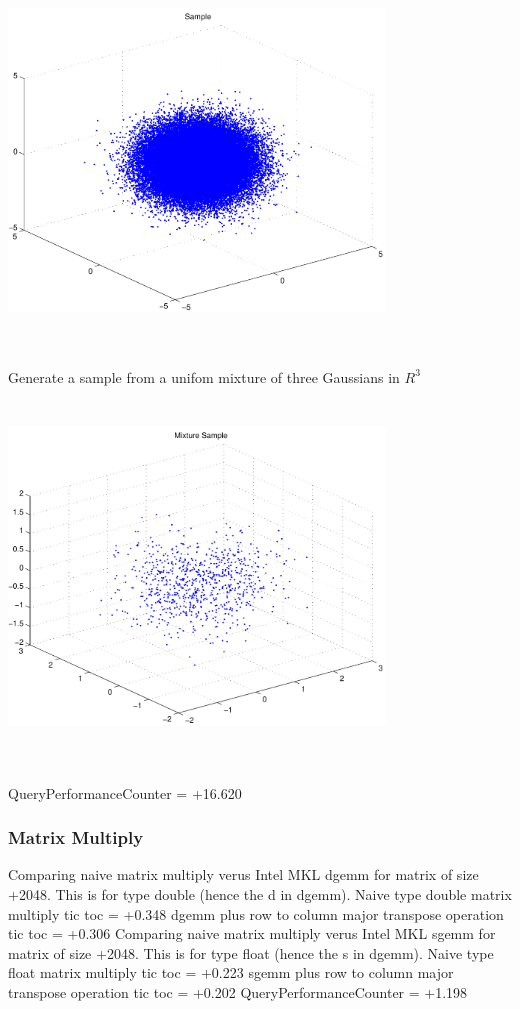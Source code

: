 \documentclass[9pt]{article}
\theoremstyle{plain}
\theoremstyle{definition}
\theoremstyle{remark}
\numberwithin{equation}{section}
\begin{document}
\includegraphics[width=10.0cm,height=10.0cm]{R_3_Normal.pdf}

Generate a sample from a unifom mixture of three Gaussians in $R^3$
\includegraphics[width=10.0cm,height=10.0cm]{R_3_Normal_Mixture.pdf}

QueryPerformanceCounter  =  +16.620
\subsubsection{Matrix Multiply}
Comparing naive matrix multiply verus Intel MKL dgemm for matrix of size +2048.
This is for type double (hence the d in dgemm).
Naive type double matrix multiply tic toc  =  +0.348
dgemm plus row to column major transpose operation tic toc  =  +0.306
Comparing naive matrix multiply verus Intel MKL sgemm for matrix of size +2048.
This is for type float (hence the s in dgemm).
Naive type float matrix multiply tic toc  =  +0.223
sgemm plus row to column major transpose operation tic toc  =  +0.202
QueryPerformanceCounter  =  +1.198
\end{document}
